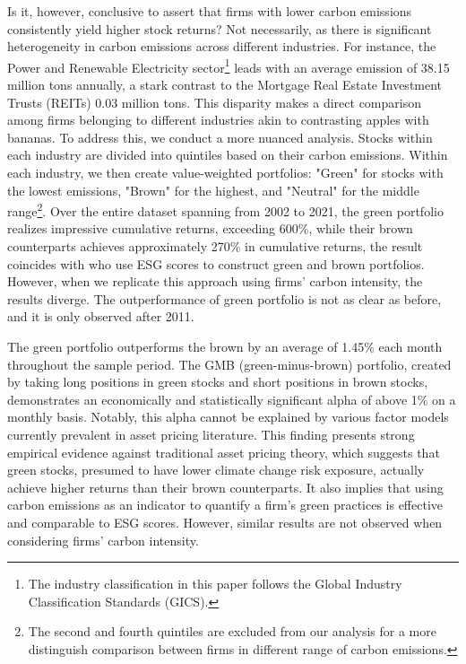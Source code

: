 \documentclass[12pt]{article}
\begin{document}
Is it, however, conclusive to assert that firms with lower carbon emissions consistently yield higher stock returns? Not necessarily, as there is significant heterogeneity in carbon emissions across different industries. For instance, the Power and Renewable Electricity sector\footnote{The industry classification in this paper follows the Global Industry Classification Standards (GICS).} leads with an average emission of 38.15 million tons annually, a stark contrast to the Mortgage Real Estate Investment Trusts (REITs) 0.03 million tons. This disparity makes a direct comparison among firms belonging to different industries akin to contrasting apples with bananas. To address this, we conduct a more nuanced analysis. Stocks within each industry are divided into quintiles based on their carbon emissions. Within each industry, we then create value-weighted portfolios: "Green" for stocks with the lowest emissions, "Brown" for the highest, and "Neutral" for the middle range\footnote{The second and fourth quintiles are excluded from our analysis for a more distinguish comparison between firms in different range of carbon emissions.}. Over the entire dataset spanning from 2002 to 2021, the green portfolio realizes impressive cumulative returns, exceeding 600\%, while their brown counterparts achieves approximately 270\% in cumulative returns, the result coincides with \cite{pastor2022dissecting} who use ESG scores to construct green and brown portfolios. However, when we replicate this approach using firms' carbon intensity, the results diverge. The outperformance of green portfolio is not as clear as before, and it is only observed after 2011.

The green portfolio outperforms the brown by an average of 1.45\% each month throughout the sample period. The GMB (green-minus-brown) portfolio, created by taking long positions in green stocks and short positions in brown stocks, demonstrates an economically and statistically significant alpha of above 1\% on a monthly basis. Notably, this alpha cannot be explained by various factor models currently prevalent in asset pricing literature. This finding presents strong empirical evidence against traditional asset pricing theory, which suggests that green stocks, presumed to have lower climate change risk exposure, actually achieve higher returns than their brown counterparts. It also implies that using carbon emissions as an indicator to quantify a firm's green practices is effective and comparable to ESG scores. However, similar results are not observed when considering firms' carbon intensity.
\end{document}
